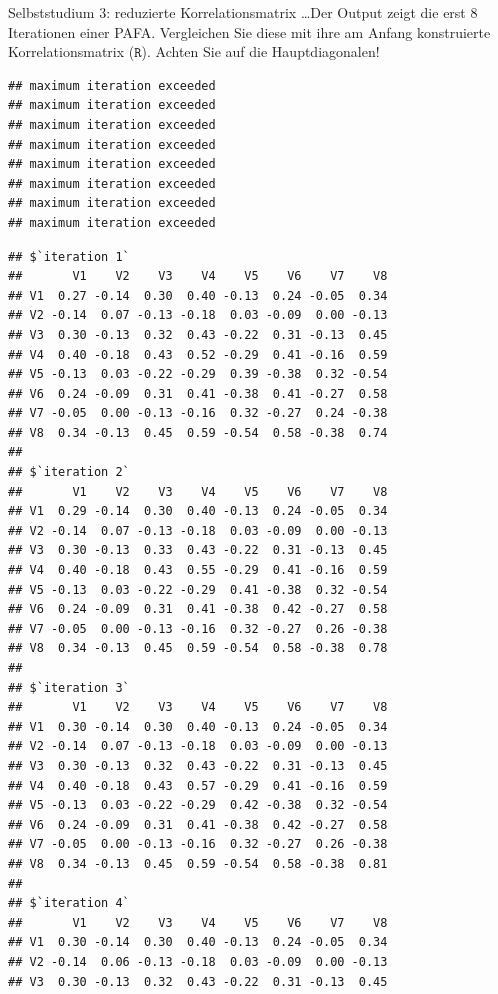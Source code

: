 \documentclass[
  ignorenonframetext,
]{beamer}
\begin{document}
\begin{frame}[fragile]{Selbststudium 3: reduzierte Korrelationsmatrix}
\protect\hypertarget{selbststudium-3-reduzierte-korrelationsmatrix}{}
\ldots Der Output zeigt die erst 8 Iterationen einer PAFA. Vergleichen
Sie diese mit ihre am Anfang konstruierte Korrelationsmatrix
(\(\texttt{R}\)). Achten Sie auf die Hauptdiagonalen!

\begin{verbatim}
## maximum iteration exceeded
## maximum iteration exceeded
## maximum iteration exceeded
## maximum iteration exceeded
## maximum iteration exceeded
## maximum iteration exceeded
## maximum iteration exceeded
## maximum iteration exceeded
\end{verbatim}

\begin{verbatim}
## $`iteration 1`
##       V1    V2    V3    V4    V5    V6    V7    V8
## V1  0.27 -0.14  0.30  0.40 -0.13  0.24 -0.05  0.34
## V2 -0.14  0.07 -0.13 -0.18  0.03 -0.09  0.00 -0.13
## V3  0.30 -0.13  0.32  0.43 -0.22  0.31 -0.13  0.45
## V4  0.40 -0.18  0.43  0.52 -0.29  0.41 -0.16  0.59
## V5 -0.13  0.03 -0.22 -0.29  0.39 -0.38  0.32 -0.54
## V6  0.24 -0.09  0.31  0.41 -0.38  0.41 -0.27  0.58
## V7 -0.05  0.00 -0.13 -0.16  0.32 -0.27  0.24 -0.38
## V8  0.34 -0.13  0.45  0.59 -0.54  0.58 -0.38  0.74
## 
## $`iteration 2`
##       V1    V2    V3    V4    V5    V6    V7    V8
## V1  0.29 -0.14  0.30  0.40 -0.13  0.24 -0.05  0.34
## V2 -0.14  0.07 -0.13 -0.18  0.03 -0.09  0.00 -0.13
## V3  0.30 -0.13  0.33  0.43 -0.22  0.31 -0.13  0.45
## V4  0.40 -0.18  0.43  0.55 -0.29  0.41 -0.16  0.59
## V5 -0.13  0.03 -0.22 -0.29  0.41 -0.38  0.32 -0.54
## V6  0.24 -0.09  0.31  0.41 -0.38  0.42 -0.27  0.58
## V7 -0.05  0.00 -0.13 -0.16  0.32 -0.27  0.26 -0.38
## V8  0.34 -0.13  0.45  0.59 -0.54  0.58 -0.38  0.78
## 
## $`iteration 3`
##       V1    V2    V3    V4    V5    V6    V7    V8
## V1  0.30 -0.14  0.30  0.40 -0.13  0.24 -0.05  0.34
## V2 -0.14  0.07 -0.13 -0.18  0.03 -0.09  0.00 -0.13
## V3  0.30 -0.13  0.32  0.43 -0.22  0.31 -0.13  0.45
## V4  0.40 -0.18  0.43  0.57 -0.29  0.41 -0.16  0.59
## V5 -0.13  0.03 -0.22 -0.29  0.42 -0.38  0.32 -0.54
## V6  0.24 -0.09  0.31  0.41 -0.38  0.42 -0.27  0.58
## V7 -0.05  0.00 -0.13 -0.16  0.32 -0.27  0.26 -0.38
## V8  0.34 -0.13  0.45  0.59 -0.54  0.58 -0.38  0.81
## 
## $`iteration 4`
##       V1    V2    V3    V4    V5    V6    V7    V8
## V1  0.30 -0.14  0.30  0.40 -0.13  0.24 -0.05  0.34
## V2 -0.14  0.06 -0.13 -0.18  0.03 -0.09  0.00 -0.13
## V3  0.30 -0.13  0.32  0.43 -0.22  0.31 -0.13  0.45

\end{verbatim}
\end{frame}
\end{document}
